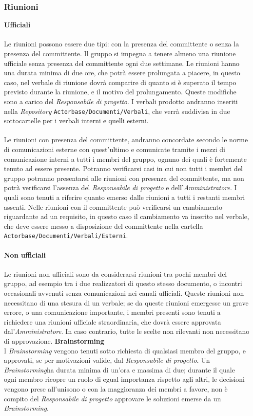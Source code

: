 \documentclass[a4paper]{article}
\begin{document}
	\subsubsection{Riunioni}
		\textbf{Ufficiali} \\ \\
		Le riunioni possono essere due tipi: con la presenza del committente o senza la presenza del committente. Il gruppo si impegna a tenere almeno una riunione
		ufficiale senza presenza del committente ogni due settimane. Le riunioni hanno una durata minima di due ore, che potrà
		essere prolungata a piacere, in questo caso, nel verbale di riunione dovrà comparire di quanto si è superato il tempo
		previsto durante la riunione, e il motivo del prolungamento. Queste modifiche sono a carico del \emph{Responsabile di progetto}.
		I verbali prodotto andranno inseriti nella \emph{Repository} \verb|Actorbase/Documenti/Verbali|, che verrà suddivisa in due
		sottocartelle per i verbali interni e quelli esterni.
\\ \\
		Le riunioni con presenza del committente, andranno concordate secondo le norme di comunicazioni esterne con quest'ultimo
		e comunicate tramite i mezzi di comunicazione interni a tutti i membri del gruppo, ognuno dei quali è fortemente tenuto ad
		essere presente. Potranno verificarsi casi in cui non tutti i membri del gruppo potranno presentarsi alle riunioni con
		presenza del committente, ma non potrà verificarsi l'assenza del \emph{Responsabile di progetto} e dell'\emph{Amministratore}.
		I quali sono tenuti a riferire quanto emerso dalle riunioni a tutti i restanti membri assenti. Nelle riunioni con il
		committente può verificarsi un cambiamento riguardante ad un requisito, in questo caso il cambiamento va inserito nel
		verbale, che deve essere messo a disposizione del committente nella cartella \verb|Actorbase/Documenti/Verbali/Esterni|.
		\\ \\
		\textbf{Non ufficiali} \\ \\
		Le riunioni non ufficiali sono da considerarsi riunioni tra pochi membri del gruppo, ad esempio tra i due realizzatori di questo
		stesso documento, o incontri occasionali avvenuti senza comunicazioni nei canali ufficiali. Queste riunioni non necessitano di
		una stesura di un verbale; se da queste riunioni emergesse un grave errore, o una comunicazione importante, i membri presenti
		sono tenuti a richiedere una riunioni ufficiale straordinaria, che dovrà essere approvata dal'\emph{Amministratore}. In caso
		contrario, tutte le scelte non rilevanti non necessitano di approvazione.
		\textbf{Brainstorming} \\
		I \emph{Brainstorming} vengono tenuti sotto richiesta di qualsiasi membro del gruppo, e approvati, se per motivazioni
		valide, dal \emph{Responsabile di progetto}. Un \emph{Brainstorming}ha durata minima di un'ora e massima di due; durante il quale
		ogni membro ricopre un ruolo di egual importanza rispetto agli altri, le decisioni vengono prese all'unisono o con la maggioranza
		dei membri a favore, non è compito del \emph{Responsabile di progetto} approvare le soluzioni emerse da un \emph{Brainstorming}.
\end{document}
